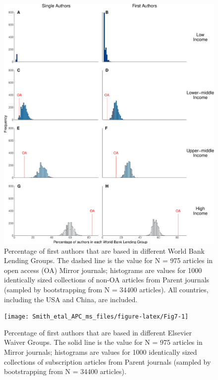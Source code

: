 \documentclass[
  english,
  man]{apa6}
\begin{document}
\begin{figure}

{\centering \includegraphics{Smith_etal_APC_ms_files/figure-latex/Fig6-1} 

}

\caption{Percentage of first authors that are based in different World Bank Lending Groups. The dashed line is the value for N =  975  articles in open access (OA) Mirror journals; histograms are values for 1000 identically sized collections of non-OA articles from Parent journals (sampled by bootstrapping from N =  34400  articles). All countries, including the USA and China, are included.}\label{fig:Fig6}
\end{figure}

\begin{figure}

{\centering \texttt{[image: Smith\_etal\_APC\_ms\_files/figure-latex/Fig7-1]} 

}

\caption{Percentage of first authors that are based in different Elsevier Waiver Groups. The solid line is the value for N =  975  articles in Mirror journals; histograms are values for 1000 identically sized collections of subscription articles from Parent journals (sampled by bootstrapping from N =  34400  articles).}\label{fig:Fig7}
\end{figure}
\end{document}
